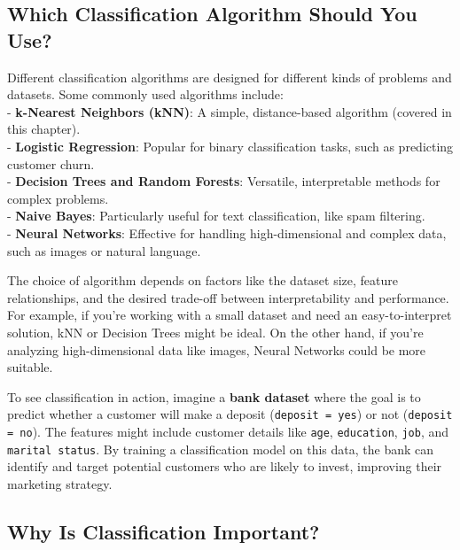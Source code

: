 \documentclass[
]{book}
\newcommand{\passthrough}[1]{#1}
\theoremstyle{definition}
\theoremstyle{definition}
\theoremstyle{definition}
\theoremstyle{definition}
\theoremstyle{remark}
\begin{document}
\subsection*{Which Classification Algorithm Should You Use?}\label{which-classification-algorithm-should-you-use}

Different classification algorithms are designed for different kinds of problems and datasets. Some commonly used algorithms include:\\
- \textbf{k-Nearest Neighbors (kNN)}: A simple, distance-based algorithm (covered in this chapter).\\
- \textbf{Logistic Regression}: Popular for binary classification tasks, such as predicting customer churn.\\
- \textbf{Decision Trees and Random Forests}: Versatile, interpretable methods for complex problems.\\
- \textbf{Naive Bayes}: Particularly useful for text classification, like spam filtering.\\
- \textbf{Neural Networks}: Effective for handling high-dimensional and complex data, such as images or natural language.

The choice of algorithm depends on factors like the dataset size, feature relationships, and the desired trade-off between interpretability and performance. For example, if you're working with a small dataset and need an easy-to-interpret solution, kNN or Decision Trees might be ideal. On the other hand, if you're analyzing high-dimensional data like images, Neural Networks could be more suitable.

To see classification in action, imagine a \textbf{bank dataset} where the goal is to predict whether a customer will make a deposit (\passthrough{\lstinline!deposit = yes!}) or not (\passthrough{\lstinline!deposit = no!}). The features might include customer details like \passthrough{\lstinline!age!}, \passthrough{\lstinline!education!}, \passthrough{\lstinline!job!}, and \passthrough{\lstinline!marital status!}. By training a classification model on this data, the bank can identify and target potential customers who are likely to invest, improving their marketing strategy.

\subsection*{Why Is Classification Important?}\label{why-is-classification-important}
\end{document}
